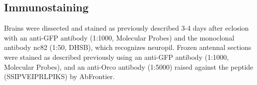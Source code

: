 \subsection*{Immunostaining}

Brains were dissected and stained as previously described \cite{Halter_Fischbach_Stocker_1999} 3-4 days after eclosion with an anti-GFP antibody (1:1000, Molecular Probes) and the monoclonal antibody nc82 (1:50, DHSB), which recognizes neuropil.
Frozen antennal sections were stained as described previously \cite{s_Chiappe_Amrein_Vosshall_2004} using an anti-GFP antibody (1:1000, Molecular Probes), and an anti-Orco antibody (1:5000) raised against the peptide (SSIPVEIPRLPIKS) by AbFrontier.